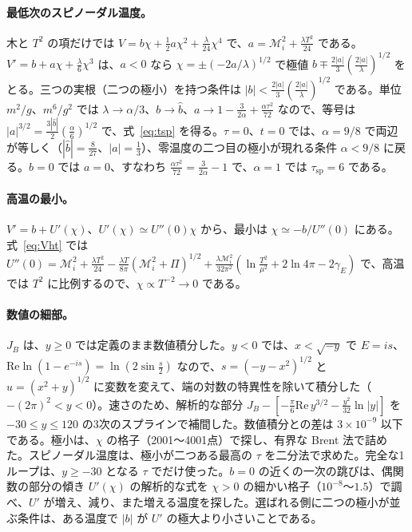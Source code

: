 \documentclass[a4paper,10pt]{ltjsarticle}
\begin{document}
\paragraph{最低次のスピノーダル温度。}木と $T^2$ の項だけでは $V=b\chi+\frac12a\chi^2+\frac\lambda{24}\chi^4$ で、$a=\mathcal M_i^2+\frac{\lambda T^2}{24}$ である。$V'=b+a\chi+\frac\lambda6\chi^3$ は、$a<0$ なら $\chi=\pm(-2a/\lambda)^{1/2}$ で極値 $b\mp\frac{2|a|}3(\frac{2|a|}\lambda)^{1/2}$ をとる。三つの実根（二つの極小）を持つ条件は $|b|<\frac{2|a|}3(\frac{2|a|}\lambda)^{1/2}$ である。単位 $m^2/g$、$m^6/g^2$ では $\lambda\to\alpha/3$、$b\to\hat b$、$a\to1-\frac3{2\alpha}+\frac{\alpha\tau^2}{72}$ なので、等号は $|a|^{3/2}=\frac{3|\hat b|}2(\frac\alpha6)^{1/2}$ で、式~\eqref{eq:tsp} を得る。$\tau=0$、$t=0$ では、$\alpha=9/8$ で両辺が等しく（$|\hat b|=\frac8{27}$、$|a|=\frac13$）、零温度の二つ目の極小が現れる条件 $\alpha<9/8$ に戻る。$\hat b=0$ では $a=0$、すなわち $\frac{\alpha\tau^2}{72}=\frac3{2\alpha}-1$ で、$\alpha=1$ では $\tau_{\mathrm{sp}}=6$ である。

\paragraph{高温の最小。}$V'=b+U'(\chi)$、$U'(\chi)\simeq U''(0)\chi$ から、最小は $\chi\simeq-b/U''(0)$ にある。式~\eqref{eq:Vht} では $U''(0)=\mathcal M_i^2+\frac{\lambda T^2}{24}-\frac{\lambda T}{8\pi}(\mathcal M_i^2+\Pi)^{1/2}+\frac{\lambda\mathcal M_i^2}{32\pi^2}(\ln\frac{T^2}{\mu^2}+2\ln4\pi-2\gamma_E)$ で、高温では $T^2$ に比例するので、$\chi\propto T^{-2}\to0$ である。

\paragraph{数値の細部。}$J_B$ は、$y\ge0$ では定義のまま数値積分した。$y<0$ では、$x<\sqrt{-y}$ で $E=is$、$\mathrm{Re}\ln(1-e^{-is})=\ln(2\sin\frac s2)$ なので、$s=(-y-x^2)^{1/2}$ と $u=(x^2+y)^{1/2}$ に変数を変えて、端の対数の特異性を除いて積分した（$-(2\pi)^2<y<0$）。速さのため、解析的な部分 $J_B-[-\frac\pi6\mathrm{Re}\,y^{3/2}-\frac{y^2}{32}\ln|y|]$ を $-30\le y\le120$ の3次のスプラインで補間した。数値積分との差は $3\times10^{-9}$ 以下である。極小は、$\chi$ の格子（2001〜4001点）で探し、有界な Brent 法で詰めた。スピノーダル温度は、極小が二つある最高の $\tau$ を二分法で求めた。完全な1ループは、$y\ge-30$ となる $\tau$ でだけ使った。$b=0$ の近くの一次の跳びは、偶関数の部分の傾き $U'(\chi)$ の解析的な式を $\chi>0$ の細かい格子（$10^{-8}$〜$1.5$）で調べ、$U'$ が増え、減り、また増える温度を探した。選ばれる側に二つの極小が並ぶ条件は、ある温度で $|b|$ が $U'$ の極大より小さいことである。
\end{document}
